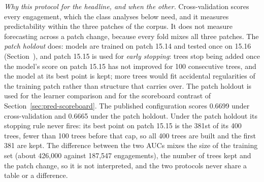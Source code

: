 \emph{Why this protocol for the headline, and when the other.} Cross-validation scores every engagement,
which the class analyses below need, and it measures predictability within the three patches of the
corpus. It does not measure forecasting across a patch change, because every fold mixes all three
patches. The \emph{patch holdout} does: models are trained on patch 15.14 and tested once on 15.16
(Section~), and patch 15.15 is used for \emph{early stopping}: trees stop
being added once the model's score on patch 15.15 has not improved for 100 consecutive trees, and the
model at its best point is kept; more trees would fit accidental regularities of the training patch
rather than structure that carries over. The patch holdout is used for the learner comparison and
for the scoreboard contrast of Section~\ref{sec:pred-scoreboard}. The published configuration scores
0.6699 under cross-validation and 0.6665 under the patch holdout. Under the patch holdout its stopping rule
never fires: its best point on patch 15.15 is the 381st of its 400 trees, fewer than 100 trees before
that cap, so all 400 trees are built and the first 381 are kept. The difference between the two AUCs mixes
the size of the training set (about 426,000 against 187,547 engagements), the number of trees kept and the
patch change, so it is not interpreted, and the two protocols never share a table or a difference.

